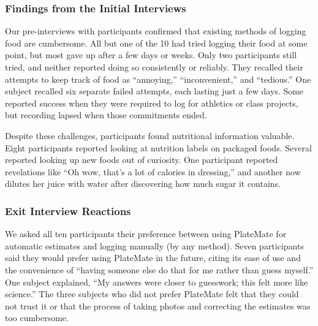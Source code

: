 \subsubsection{Findings from the Initial Interviews}
Our pre-interviews with participants confirmed that existing methods of logging food are cumbersome. All but one of the 10 had tried logging their food at some point, but most gave up after a few days or weeks. Only two participants still tried, and neither reported doing so consistently or reliably. They recalled their attempts to keep track of food as ``annoying,'' ``inconvenient,'' and ``tedious.'' One subject recalled six separate failed attempts, each lasting just a few days. Some reported success when they were required to log for athletics or class projects, but recording lapsed when those commitments ended.

Despite these challenges, participants found nutritional information valuable. Eight participants reported looking at nutrition labels on packaged foods. Several reported looking up new foods out of curiosity. One participant reported revelations like ``Oh wow, that's a lot of calories in dressing,'' and another now dilutes her juice with water after discovering how much sugar it contains.



\subsubsection{Exit Interview Reactions}
We asked all ten participants their preference between using PlateMate for automatic estimates and logging manually (by any method). Seven participants said they would prefer using PlateMate in the future, citing its ease of use and the convenience of ``having someone else do that for me rather than guess myself.'' One subject explained, ``My answers were closer to guesswork; this felt more like science.'' The three subjects who did not prefer PlateMate felt that they could not trust it or that the process of taking photos and correcting the estimates was too cumbersome.

